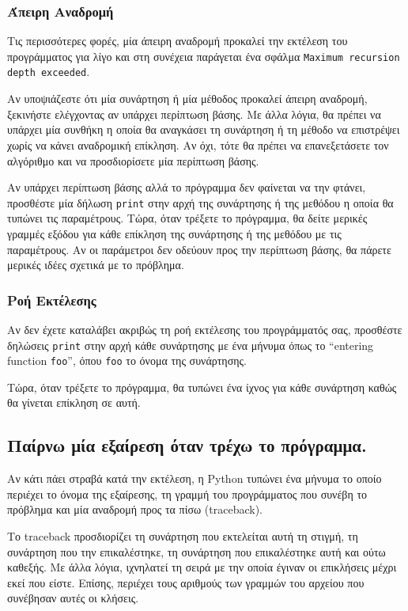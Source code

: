 \documentclass[10pt]{book}
\begin{document}
\subsubsection{Άπειρη Αναδρομή}

Τις περισσότερες φορές, μία άπειρη αναδρομή προκαλεί την εκτέλεση του προγράμματος για λίγο και στη συνέχεια παράγεται
ένα σφάλμα {\tt Maximum recursion depth exceeded}.

Αν υποψιάζεστε ότι μία συνάρτηση ή μία μέθοδος προκαλεί άπειρη αναδρομή, 
ξεκινήστε ελέγχοντας αν υπάρχει περίπτωση βάσης.  Με άλλα λόγια, θα πρέπει να 
υπάρχει μία συνθήκη η οποία θα αναγκάσει τη συνάρτηση ή τη μέθοδο να επιστρέψει 
χωρίς να κάνει αναδρομική επίκληση.  Αν όχι, τότε θα πρέπει να επανεξετάσετε τον 
αλγόριθμο και να προσδιορίσετε μία περίπτωση βάσης.

Αν υπάρχει περίπτωση βάσης αλλά το πρόγραμμα δεν φαίνεται να την φτάνει, προσθέστε
μία δήλωση {\tt print} στην αρχή της συνάρτησης ή της μεθόδου η οποία θα τυπώνει τις παραμέτρους.
Τώρα, όταν τρέξετε το πρόγραμμα, θα δείτε μερικές γραμμές εξόδου για κάθε επίκληση της συνάρτησης
ή της μεθόδου με τις παραμέτρους.  Αν οι παράμετροι δεν οδεύουν προς την περίπτωση βάσης,
θα πάρετε μερικές ιδέες σχετικά με το πρόβλημα.


\subsubsection{Ροή Εκτέλεσης}

Αν δεν έχετε καταλάβει ακριβώς τη ροή εκτέλεσης του προγράμματός σας, προσθέστε δηλώσεις {\tt print}
στην αρχή κάθε συνάρτησης με ένα μήνυμα όπως το ``entering function {\tt foo}'', όπου {\tt foo} το όνομα της συνάρτησης.

Τώρα, όταν τρέξετε το πρόγραμμα, θα τυπώνει ένα ίχνος για κάθε συνάρτηση καθώς 
θα γίνεται επίκληση σε αυτή.


\subsection{Παίρνω μία εξαίρεση όταν τρέχω το πρόγραμμα.}

Αν κάτι πάει στραβά κατά την εκτέλεση, η Python τυπώνει ένα μήνυμα το οποίο 
περιέχει το όνομα της εξαίρεσης, τη γραμμή του προγράμματος που συνέβη το πρόβλημα 
και μία αναδρομή προς τα πίσω (traceback).

Το traceback προσδιορίζει τη συνάρτηση που εκτελείται αυτή τη στιγμή, τη συνάρτηση που την επικαλέστηκε,
τη συνάρτηση που επικαλέστηκε αυτή και ούτω καθεξής.  Με άλλα λόγια, ιχνηλατεί τη σειρά με την οποία έγιναν
οι επικλήσεις μέχρι εκεί που είστε.  Επίσης, περιέχει τους αριθμούς των γραμμών του αρχείου που
συνέβησαν αυτές οι κλήσεις.
\end{document}
